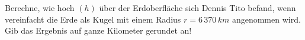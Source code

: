 \begin{beispiel}[AG 4.1]{1}
Berechne, wie hoch $(h)$ über der Erdoberfläche sich Dennis Tito befand, wenn vereinfacht die Erde als Kugel mit einem Radius $r=6\,370\,km$ angenommen wird.
Gib das Ergebnis auf ganze Kilometer gerundet an!
\leer

\end{beispiel}